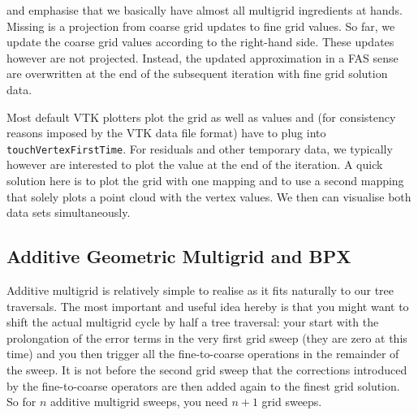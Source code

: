 \noindent
and emphasise that we basically have almost all multigrid ingredients at hands.
Missing is a projection from coarse grid updates to fine grid values.
So far, we update the coarse grid values according to the right-hand side.
These updates however are not projected.
Instead, the updated approximation in a FAS sense are overwritten at the end of
the subsequent iteration with fine grid solution data. 


\begin{remark}
  Most default VTK plotters plot the grid as well as values and (for
  consistency reasons imposed by the VTK data file format) have to plug into
  \texttt{touchVertexFirstTime}. For residuals and other temporary data, we
  typically however are interested to plot the value at the end of the
  iteration. A quick solution here is to plot the grid with one mapping and to
  use a second mapping that solely plots a point cloud with the vertex values.
  We then can visualise both data sets simultaneously.
\end{remark}





\subsection{Additive Geometric Multigrid and BPX}

Additive multigrid is relatively simple to realise as it fits naturally to our
tree traversals.
The most important and useful idea hereby is that you might want to shift the
actual multigrid cycle by half a tree traversal:
your start with the prolongation of the error terms in the very first grid sweep
(they are zero at this time) and you then trigger all the fine-to-coarse
operations in the remainder of the sweep.
It is not before the second grid sweep that the corrections introduced by the
fine-to-coarse operators are then added again to the finest grid solution. 
So for $n$ additive multigrid sweeps, you need $n+1$ grid sweeps.



